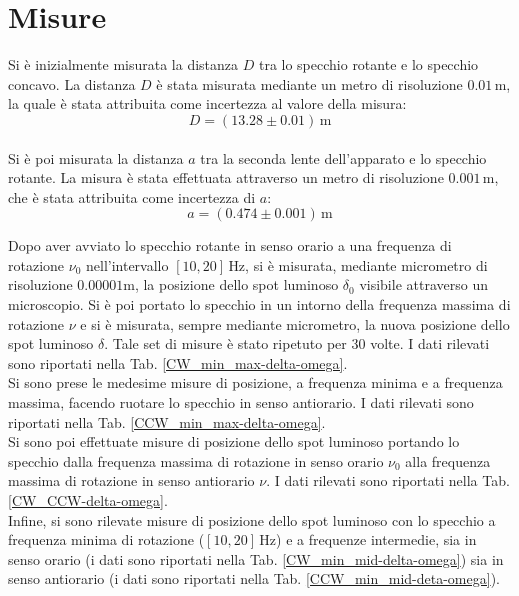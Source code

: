 \documentclass[]{article}
\let\oldsection\section%
\renewcommand{\section}{%
	\renewcommand{\theequation}{\thesection.\arabic{equation}}%
	\oldsection}%
\begin{document}
    \section{Misure}
    
    Si è inizialmente misurata la distanza $D$ tra lo specchio rotante e lo specchio concavo. La distanza $D$ è stata misurata mediante un metro di risoluzione $ 0.01 \, \text{m} $, la quale è stata attribuita come incertezza al valore della misura:
    \begin{equation}
        \label{equation-for-D}
        D = (13.28 \pm 0.01) \, \text{m}
    \end{equation} \\
    Si è poi misurata la distanza $a$ tra la seconda lente dell'apparato e lo specchio rotante. La misura è stata effettuata attraverso un metro di risoluzione $ 0.001 \, \text{m} $, che è stata attribuita come incertezza di $a$:
    \begin{equation}
        \label{equation for a}
        a = (0.474 \pm 0.001) \, \text{m}
    \end{equation}

    Dopo aver avviato lo specchio rotante in senso orario a una frequenza di rotazione $ \nu_0 $ nell'intervallo $[10,20] \, \text{Hz}$, si è misurata, mediante micrometro di risoluzione $ 0.00001 \text{m} $, la posizione dello spot luminoso $\delta_0$ visibile attraverso un microscopio. Si è poi portato lo specchio in un intorno della frequenza massima di rotazione $ \nu $ e si è misurata, sempre mediante micrometro, la nuova posizione dello spot luminoso $\delta$. Tale set di misure è stato ripetuto per $30$ volte. I dati rilevati sono riportati nella Tab. \ref{CW_min_max-delta-omega}. \\
    Si sono prese le medesime misure di posizione, a frequenza minima e a frequenza massima, facendo ruotare lo specchio in senso antiorario. I dati rilevati sono riportati nella Tab. \ref{CCW_min_max-delta-omega}. \\
    Si sono poi effettuate misure di posizione dello spot luminoso portando lo specchio dalla frequenza massima di rotazione in senso orario $\nu_0$ alla frequenza massima di rotazione in senso antiorario $\nu$. I dati rilevati sono riportati nella Tab. \ref{CW_CCW-delta-omega}. \\
    Infine, si sono rilevate misure di posizione dello spot luminoso con lo specchio a frequenza minima di rotazione ($[10,20] \, \text{Hz}$) e a frequenze intermedie, sia in senso orario (i dati sono riportati nella Tab. \ref{CW_min_mid-delta-omega}) sia in senso antiorario (i dati sono riportati nella Tab. \ref{CCW_min_mid-deta-omega}).
\end{document}
